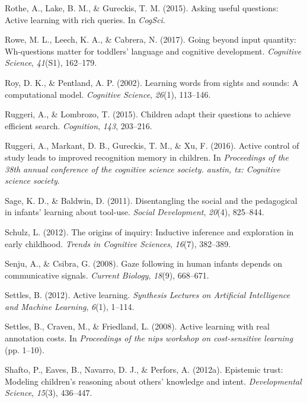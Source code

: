 \documentclass[oneside]{report}
\begin{document}
\hypertarget{ref-rothe2015asking}{}
Rothe, A., Lake, B. M., \& Gureckis, T. M. (2015). Asking useful
questions: Active learning with rich queries. In \emph{CogSci}.

\hypertarget{ref-rowe2017going}{}
Rowe, M. L., Leech, K. A., \& Cabrera, N. (2017). Going beyond input
quantity: Wh-questions matter for toddlers' language and cognitive
development. \emph{Cognitive Science}, \emph{41}(S1), 162--179.

\hypertarget{ref-roy2002learning}{}
Roy, D. K., \& Pentland, A. P. (2002). Learning words from sights and
sounds: A computational model. \emph{Cognitive Science}, \emph{26}(1),
113--146.

\hypertarget{ref-ruggeri2015children}{}
Ruggeri, A., \& Lombrozo, T. (2015). Children adapt their questions to
achieve efficient search. \emph{Cognition}, \emph{143}, 203--216.

\hypertarget{ref-ruggeri2016active}{}
Ruggeri, A., Markant, D. B., Gureckis, T. M., \& Xu, F. (2016). Active
control of study leads to improved recognition memory in children. In
\emph{Proceedings of the 38th annual conference of the cognitive science
society. austin, tx: Cognitive science society}.

\hypertarget{ref-sage2011disentangling}{}
Sage, K. D., \& Baldwin, D. (2011). Disentangling the social and the
pedagogical in infants' learning about tool-use. \emph{Social
Development}, \emph{20}(4), 825--844.

\hypertarget{ref-schulz2012origins}{}
Schulz, L. (2012). The origins of inquiry: Inductive inference and
exploration in early childhood. \emph{Trends in Cognitive Sciences},
\emph{16}(7), 382--389.

\hypertarget{ref-senju2008gaze}{}
Senju, A., \& Csibra, G. (2008). Gaze following in human infants depends
on communicative signals. \emph{Current Biology}, \emph{18}(9),
668--671.

\hypertarget{ref-settles2012active}{}
Settles, B. (2012). Active learning. \emph{Synthesis Lectures on
Artificial Intelligence and Machine Learning}, \emph{6}(1), 1--114.

\hypertarget{ref-settles2008active}{}
Settles, B., Craven, M., \& Friedland, L. (2008). Active learning with
real annotation costs. In \emph{Proceedings of the nips workshop on
cost-sensitive learning} (pp. 1--10).

\hypertarget{ref-shafto2012epistemic}{}
Shafto, P., Eaves, B., Navarro, D. J., \& Perfors, A. (2012a). Epistemic
trust: Modeling children's reasoning about others' knowledge and intent.
\emph{Developmental Science}, \emph{15}(3), 436--447.
\end{document}
